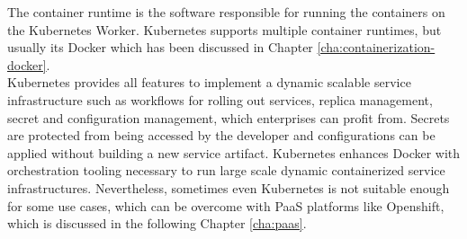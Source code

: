 The container runtime is the software responsible for running the containers on the Kubernetes Worker. Kubernetes supports multiple container runtimes, but usually its Docker which has been discussed in Chapter \vref{cha:containerization-docker}. \\

Kubernetes provides all features to implement a dynamic scalable service infrastructure such as workflows for rolling out services, replica management, secret and configuration management, which enterprises can profit from. Secrets are protected from being accessed by the developer and configurations can be applied without building a new service artifact. Kubernetes enhances Docker with orchestration tooling necessary to run large scale dynamic containerized service infrastructures. Nevertheless, sometimes even Kubernetes is not suitable enough for some use cases, which can be overcome with PaaS platforms like Openshift, which is discussed in the following Chapter \vref{cha:paas}.   

